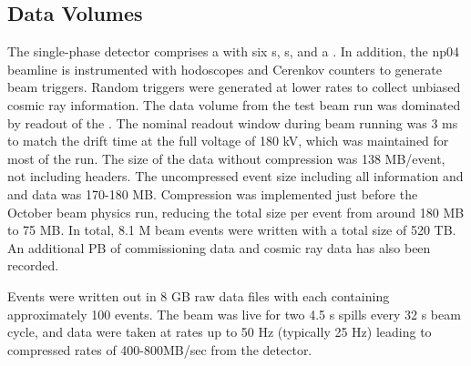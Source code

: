 \subsection{Data Volumes}
The single-phase  detector comprises a  with  six s, s, and a . In addition, the np04 beamline is instrumented with hodoscopes and Cerenkov counters to generate beam triggers. Random triggers  were generated at lower rates to collect unbiased cosmic ray information. The data volume from the test beam run was dominated by readout of the . %
The nominal readout window during beam running was  3 ms to match the drift time at the full voltage of 180 kV, which was maintained for most of the run.  The size of the  data without compression was  138 MB/event, not including headers.  The uncompressed event size including all  information and  and  data was 170-180 MB. Compression was implemented just before the October beam physics run, reducing the total size per event from around 180 MB to 75 MB.  In total, 8.1 M beam events were written with a total size of 520 TB.  An additional PB of commissioning data and cosmic ray data has also been recorded. 


Events were written out in 8 GB raw data files with each containing approximately 100 events. The beam was live for two 4.5 s spills every 32 s beam cycle, and data were taken at  rates up to 50 Hz (typically 25 Hz) leading to compressed  rates of 400-800MB/sec from the detector.  %


